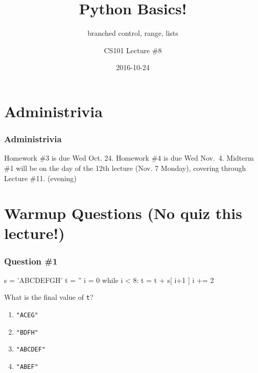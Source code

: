 \documentclass[11pt]{beamer}
\title{Python Basics!}
\subtitle{branched control, range, lists}
\author{CS101 Lecture \#8}
\date{2016-10-24}
\begin{document}
  \setcounter{showProgressBar}{0}
  \setcounter{showSlideNumbers}{0}

\frame{\titlepage}

\setcounter{framenumber}{0}
\setcounter{showProgressBar}{1}
\setcounter{showSlideNumbers}{1}

\section{Administrivia}

\begin{frame}
  \frametitle{Administrivia}
  \Enlarge
  \begin{itemize}
  \myitem  Homework \#3 is due Wed Oct. 24.
  \myitem  Homework \#4 is due Wed Nov.\ 4.
  \myitem Midterm \#1 will be on the day of the 12th lecture (Nov. 7 Monday), covering through Lecture \#11. (evening)
  \end{itemize}
\end{frame}

\section{Warmup Questions (No quiz this lecture!)}

\begin{frame}[fragile]
  \frametitle{Question \#1}
  \Enlarge

  \begin{semiverbatim}
s = 'ABCDEFGH'
t = ''
i = 0
while i < 8:
    t = t + s[ i+1 ]
    i += 2
  \end{semiverbatim}
  What is the final value of \texttt{t}?
  \begin{enumerate}[label=\Alph*]
  \item  \texttt{"ACEG"}
  \item  \texttt{"BDFH"} %
  \item  \texttt{"ABCDEF"}
  \item  \texttt{"ABEF"}
  \end{enumerate}
\end{frame}
\end{document}
